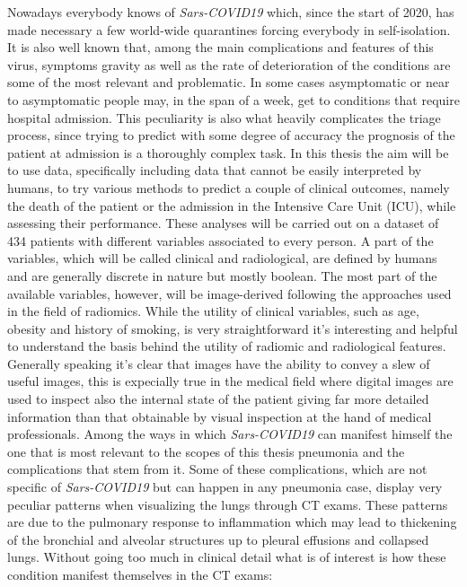Nowadays everybody knows of  \textit{Sars-COVID19} which, since the start of 2020, has made necessary a few world-wide quarantines forcing everybody in self-isolation. It is also well known that, among the main complications and features of this virus, symptoms gravity as well as the rate of deterioration of the conditions are some of the most relevant and problematic. In some cases asymptomatic or near to asymptomatic people may, in the span of a week, get to conditions that require hospital admission. This peculiarity is also what heavily complicates the triage process, since trying to predict with some degree of accuracy the prognosis of the patient at admission is a thoroughly complex task. In this thesis the aim will be to use data, specifically including data that cannot be easily interpreted by humans, to try various methods to predict a couple of clinical outcomes, namely the death of the patient or the admission in the Intensive Care Unit (ICU), while assessing their performance. These analyses will be carried out on a dataset of 434 patients with different variables associated to every person. A part of the variables, which will be called clinical and radiological, are defined by humans and are generally discrete in nature but mostly boolean. The most part of the available variables, however, will be image-derived following the approaches used in the field of radiomics. While the utility of clinical variables, such as age, obesity and history of smoking, is very straightforward it's interesting and helpful to understand the basis behind the utility of radiomic and radiological features.
Generally speaking it's clear that images have the ability to convey a slew of useful images, this is expecially true in the medical field where digital images are used to inspect also the internal state of the patient giving far more detailed information than that obtainable by visual inspection at the hand of medical professionals. Among the ways in which \textit{Sars-COVID19} can manifest himself the one that is most relevant to the scopes of this thesis pneumonia and the complications that stem from it. Some of these complications, which are not specific of \textit{Sars-COVID19} but can happen in any pneumonia case, display very peculiar patterns when visualizing the lungs through CT exams.
These patterns are due to the pulmonary response to inflammation which may lead to thickening of the bronchial and alveolar structures up to pleural effusions and collapsed lungs. Without going too much in clinical detail what is of interest is how these condition manifest themselves in the CT exams:

